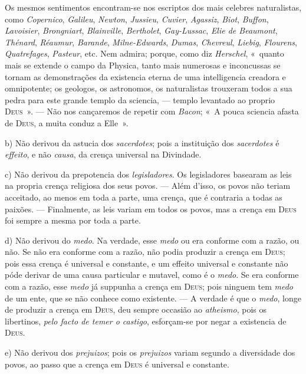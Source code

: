 {Os mesmos sentimentos encontram-se nos escriptos dos mais celebres naturalistas, como
\emph{Copernico}, \emph{Galileu}, \emph{Newton}, \emph{Jussieu}, \emph{Cuvier},
\emph{Agassiz}, \emph{Biot}, \emph{Buffon}, \emph{Lavoisier}, \emph{Brongniart},
\emph{Blainville}, \emph{Bertholet}, \emph{Gay-Lussac}, \emph{Elie de Beaumont},
\emph{Thénard}, \emph{Réaumur}, \emph{Barande}, \emph{Milne-Edwards}, \emph{Dumas},
\emph{Chevreul}, \emph{Liebig}, \emph{Flourens}, \emph{Quatrefages}, \emph{Pasteur},
etc. Nem admira; porque, como diz \emph{Herschel}, «~quanto mais se extende o campo da
Physica, tanto mais numerosas e
inconcussas se tornam as demonstrações da existencia eterna de uma intelligencia
creadora e omnipotente; os geologos, os astronomos, os naturalistas trouxeram todos a
sua pedra para este grande templo da sciencia, --- templo levantado ao proprio
\textsc{Deus}~». --- Não nos cançaremos de repetir com \emph{Bacon}; «~A pouca sciencia
afasta de \textsc{Deus}, a muita conduz a Elle~».

b) Não derivou da astucia dos \emph{sacerdotes}; pois a instituição dos
\emph{sacerdotes} é \emph{effeito}, e não \emph{causa}, da crença universal na
Divindade.

c) Não derivou da prepotencia dos \emph{legisladores}. Os legisladores basearam as leis
na propria crença religiosa dos seus povos. --- Além d'isso, os povos não teriam
acceitado, ao menos em toda a parte, uma crença, que é contraria a todas as paixões. ---
Finalmente, as leis variam em todos os povos, mas a crença em \textsc{Deus} foi sempre a
mesma por toda a parte.

d) Não derivou do \emph{medo}. Na verdade, esse \emph{medo} ou era conforme com a razão,
ou não. Se não era conforme com a razão, não podia produzir a crença em \textsc{Deus};
pois essa crença é universal e constante, e um effeito universal e constante não póde
derivar de uma causa particular e mutavel, como é o \emph{medo}. Se era conforme com a
razão, esse \emph{medo} já suppunha a crença em \textsc{Deus}; pois ninguem tem
\emph{medo} de um ente, que se não conhece como existente. --- A verdade é que o
\emph{medo}, longe de produzir a crença em \textsc{Deus}, deu sempre occasião ao
\emph{atheismo}, pois os libertinos, \emph{pelo facto de temer o castigo}, esforçam-se
por negar a existencia de \textsc{Deus}.

e) Não derivou dos \emph{prejuizos}; pois os \emph{prejuizos} variam segundo a
diversidade dos povos, ao passo que a crença em \textsc{Deus} é universal e constante.}

